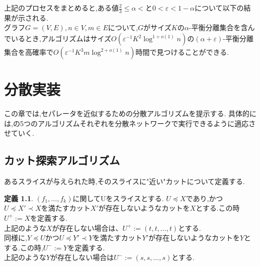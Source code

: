 \documentclass{thesis}
\theoremstyle{definition}
\newtheorem{definition}{定義}
\begin{document}
上記のプロセスをまとめると,ある値$\frac{2}{3} \leq \alpha <$と$0 < \varepsilon <1-\alpha$について以下の結果が示される.\\
グラフ$G=(V,E),n \in V,m \in E$について,$G$がサイズ$K$の$\alpha$-平衡分離集合を含んでいるとき,アルゴリズムはサイズ$O(\varepsilon^{-1} K^2 \log^{1+o(1)}n)$の$(\alpha + \varepsilon)$-平衡分離集合を高確率で$O(\varepsilon^{-1}K^3m\log^{2+o(1)}n)$時間で見つけることができる.

\chapter{分散実装}
この章では,セパレータを近似するための分散アルゴリズムを提示する.
具体的には,\cite{brandt2017approximating}の5つのアルゴリズムそれぞれを分散ネットワークで実行できるように適応させていく.

\section{カット探索アルゴリズム}
あるスライスが与えられた時,そのスライスに"近い"カットについて定義する.

\begin{definition}
    $(f_1, \dots ,f_k)$に関してUをスライスとする.
    $U\preceq X$であり,かつ$U\preceq X'\prec X$を満たすカット$X'$が存在しないようなカットを$X$とする.この時$U^+:=X$を定義する.\\
    上記のような$X$が存在しない場合は、$U^+:=(t,t,\dots,t)$とする.\\
    同様に,$Y\preceq U$かつ$U\preceq Y'\prec Y$を満たすカット$Y'$が存在しないようなカットを$Y$とする.この時,$U^-:=Y$を定義する.\\
    上記のような$Y$が存在しない場合は$U^-:=(s,s,\dots,s)$とする. 
\end{definition}
\end{document}
